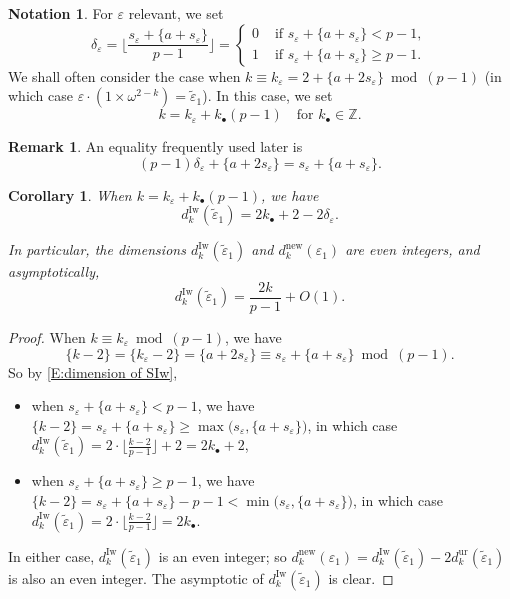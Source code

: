 \documentclass[12pt]{amsart}
\newtheorem{corollary}[subsection]{Corollary}
\theoremstyle{definition}
\newtheorem{remark}[subsection]{Remark}
\newtheorem{notation}[subsection]{Notation}
\numberwithin{equation}{subsection}
\def\ZZ{\mathbb{Z}}
\newcommand{\Iw}{\mathrm{Iw}}
\newcommand{\unr}{\mathrm{ur}}
\begin{document}
\begin{notation}
\label{N:kbullet}
For $\varepsilon$ relevant, we set
$$
\delta_\varepsilon = \Big\lfloor \frac{s_\varepsilon + \{a+s_\varepsilon\}}{p-1}\Big \rfloor = \begin{cases}
0 & \textrm{ if }s_\varepsilon + \{a+s_\varepsilon\} < p-1,\\
1 & \textrm{ if }s_\varepsilon + \{a+s_\varepsilon\} \geq p-1.
\end{cases}
$$
We shall often consider the case when $k \equiv k_\varepsilon =2+ \{a+2s_\varepsilon \} \bmod{(p-1)}$ (in which case $\varepsilon\cdot (1\times \omega^{2-k}) = \tilde \varepsilon_1$). In this case, we set $$k = k_\varepsilon + k_\bullet(p-1) \quad \textrm{for }k_\bullet \in \ZZ.$$
\end{notation}

\begin{remark}
\label{R:delta}
An equality frequently used later is
\[
(p-1)\delta_{\varepsilon}+\{a+2s_{\varepsilon}\}=s_{\varepsilon}+\{a+s_{\varepsilon}\}.
\]
\end{remark}

\begin{corollary}
\label{C:dIw is even}
When $k = k_\varepsilon + k_\bullet (p-1)$, we have
$$
d_{k}^\Iw(\tilde \varepsilon_1) = 2k_\bullet +2 -2 \delta_\varepsilon.
$$

In particular,
the dimensions $d_{k}^\Iw(\tilde \varepsilon_1)$ and $d_{k}^{\mathrm{new}}(\varepsilon_1)$ are even integers, and asymptotically, $$d_k^\Iw(\tilde \varepsilon_1) = \frac{2k}{p-1}+O(1).$$ 
\end{corollary}
\begin{proof}
When $k \equiv k_\varepsilon \bmod{(p-1)}$, we have
$$\{k-2\} = \{k_\varepsilon-2\} = \{a+2s_\varepsilon\} \equiv s_\varepsilon + \{a+s_\varepsilon\} \bmod{(p-1)}.$$
So by \eqref{E:dimension of SIw}, 
\begin{itemize}
\item when $s_\varepsilon+\{a+s_\varepsilon\}<p-1$, we have $\{k-2\} = s_\varepsilon+\{a+s_\varepsilon\} \geq \max\big( s_\varepsilon, \{a+s_\varepsilon\}\big)$, in which case $d_{k}^\Iw(\tilde \varepsilon_1) = 2 \cdot \big\lfloor \frac{k-2}{p-1}\big\rfloor +2 =2k_\bullet +2$,
\item when $s_\varepsilon+\{a+s_\varepsilon\} \geq p-1$, we have $\{k-2\} = s_\varepsilon+\{a+s_\varepsilon\} - p-1< \min\big( s_\varepsilon, \{a+s_\varepsilon\} \big)$, in which case $d_{k}^\Iw(\tilde \varepsilon_1) = 2 \cdot \big\lfloor \frac{k-2}{p-1}\big\rfloor =2 k_\bullet $.
\end{itemize}
In either case, $d_{k}^\Iw(\tilde \varepsilon_1)$ is an even integer; so $d_{k}^{\textrm{new}}(\varepsilon_1) = d_{k}^\Iw(\tilde \varepsilon_1)- 2 d_{k}^\unr(\tilde \varepsilon_1)$ is also an even integer.
The asymptotic of $d_{k}^\Iw(\tilde \varepsilon_1)$ is clear.
\end{proof}
\end{document}

